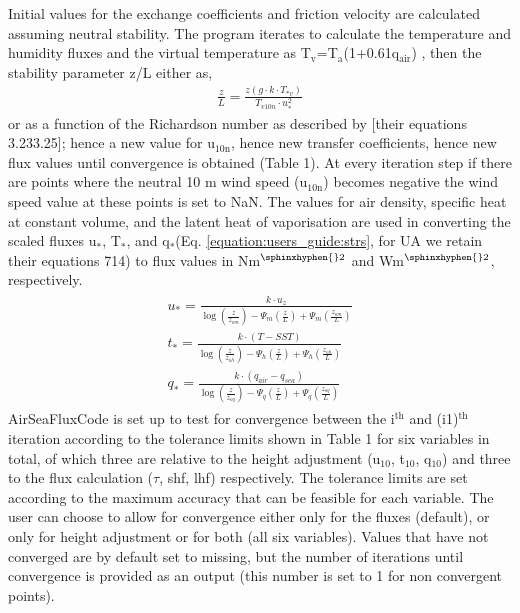 \documentclass[letterpaper,10pt,english]{sphinxmanual}
\begin{document}
\sphinxAtStartPar
Initial values for the exchange coefficients and friction velocity are calculated assuming neutral stability. The program iterates to calculate the temperature and humidity fluxes and the virtual temperature as T$_{\text{v}}$=T$_{\text{a}}$(1+0.61q$_{\text{air}}$) , then the stability parameter z/L either as,
\begin{equation}\label{equation:users_guide:zol}
\begin{split}\frac{z}{L}=\frac{z(g \cdot k \cdot T_{*v})}{T_{v10n} \cdot u_{*}^{2}}\end{split}
\end{equation}
\sphinxAtStartPar
or  as a function of the Richardson number as described by  {[}their equations 3.23\textendash{}3.25{]}; hence a new value for u$_{\text{10n}}$, hence new transfer coefficients, hence new flux values until convergence is obtained (Table 1).  At every iteration step if there are points where the neutral 10 m wind speed (u$_{\text{10n}}$) becomes negative the wind speed value at these points is set to NaN.
The values for air density, specific heat at constant volume, and the latent heat of vaporisation are used in converting the scaled fluxes u$_{\text{*}}$, T$_{\text{*}}$, and q$_{\text{*}}$(Eq. \ref{equation:users_guide:strs}, for UA we retain their equations 7\sphinxhyphen{}14) to flux values in Nm$^{\text{\sphinxhyphen{}2}}$ and Wm$^{\text{\sphinxhyphen{}2}}$, respectively.
\begin{equation}\label{equation:users_guide:strs}
\begin{split}\begin{array}{l}
  u_{\ast} = \frac{k\cdot u_{z}}{\log(\frac{z}{z_{om}})-\Psi_{m}(\frac{z}{L})+\Psi_{m}(\frac{z_{om}}{L})} \\
  t_{\ast} = \frac{k\cdot (T-SST)}{\log(\frac{z}{z_{oh}})-\Psi_{h}(\frac{z}{L})+\Psi_{h}(\frac{z_{oh}}{L})} \\
  q_{\ast} = \frac{k\cdot (q_{air}-q_{sea})}{\log(\frac{z}{z_{oq}})-\Psi_{q}(\frac{z}{L})+\Psi_{q}(\frac{z_{oq}}{L})}
\end{array}\end{split}
\end{equation}
\sphinxAtStartPar
AirSeaFluxCode is set up to test for convergence between the i$^{\text{th}}$ and (i\sphinxhyphen{}1)$^{\text{th}}$ iteration according to the tolerance limits shown in Table 1 for six variables in total, of which three are relative to the height adjustment (u$_{\text{10}}$, t$_{\text{10}}$, q$_{\text{10}}$) and three to the flux calculation (\(\tau\), shf, lhf) respectively. The tolerance limits are set according to the maximum accuracy that can be feasible for each variable. The user can choose to allow for convergence either only for the fluxes (default), or only for height adjustment or for both (all six variables). Values that have not converged are by default set to missing, but the number of iterations until convergence is provided as an output (this number is set to \sphinxhyphen{}1 for non convergent points).
\end{document}
